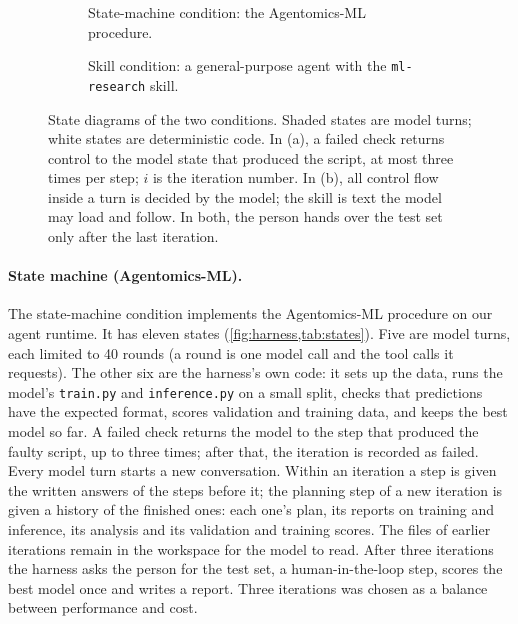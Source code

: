 \begin{figure}[tbp]\centering
\begin{subfigure}{\linewidth}\centering

\caption{State-machine condition: the Agentomics-ML procedure.}\label{fig:harness}
\end{subfigure}

\vspace{1.2em}
\begin{subfigure}{\linewidth}\centering

\caption{Skill condition: a general-purpose agent with the \texttt{ml-research} skill.}\label{fig:agent}
\end{subfigure}
\caption{State diagrams of the two conditions. Shaded states are model turns; white states are deterministic code. In
(a), a failed check returns control to the model state that produced the script, at most three times per step; $i$ is
the iteration number. In (b), all control flow inside a turn is decided by the model; the skill is text the model may
load and follow. In both, the person hands over the test set only after the last iteration.}
\label{fig:machines}
\end{figure}

\paragraph{State machine (Agentomics-ML).} The state-machine condition implements the Agentomics-ML procedure on our
agent runtime. It has eleven states (\cref{fig:harness,tab:states}). Five are model
turns, each limited to 40 rounds (a round is one model call and the tool calls it requests). The other six are the
harness's own code: it sets up the data, runs the model's \texttt{train.py} and \texttt{inference.py} on a small split,
checks that predictions have the expected format, scores validation and training data, and keeps the best model so far.
A failed check returns the model to the step that produced the faulty script, up to three times; after that, the
iteration is recorded as failed. Every model turn starts a new conversation. Within an iteration a step is given the
written answers of the steps before it; the planning step of a new iteration is given a history of the finished ones:
each one's plan, its reports on training and inference, its analysis and its validation and training scores. The
files of earlier iterations remain in the workspace for the model to read. After three iterations the harness asks the person for the test set, a
human-in-the-loop step, scores the best model once and writes a report. Three iterations was chosen as a balance between performance and cost.

